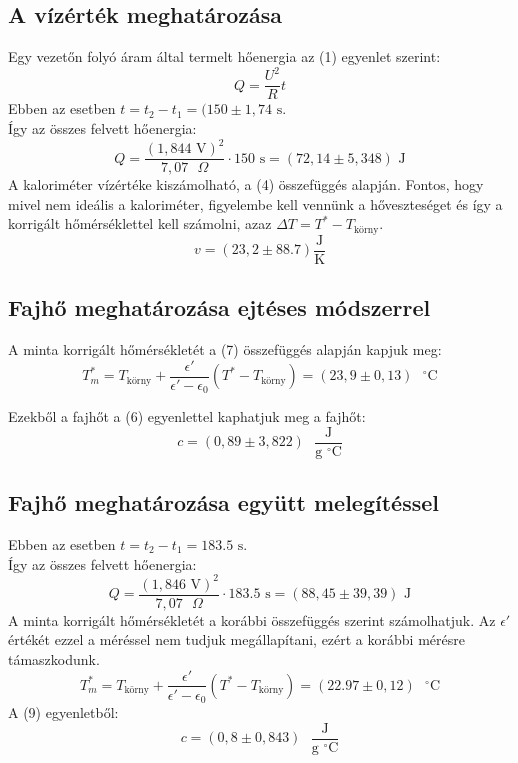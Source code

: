 \documentclass[a4paper, 12pt, oneside]{article}
\begin{document}
\subsection*{A vízérték meghatározása}
    Egy vezetőn folyó áram által termelt hőenergia az (1) egyenlet szerint:
    $$ Q = \frac{U^2}{R}t$$
    Ebben az esetben $t = t_2 - t_1 = (150 \pm 1,74 \textrm{ s}$. \\ Így az összes felvett hőenergia: $$Q = \frac{(1,844 \textrm{ V})^2}{7,07 \textrm{ }\Omega } \cdot 150 \textrm{ s} = (72,14 \pm 5,348) \textrm{ J}$$
    A kaloriméter vízértéke kiszámolható, a (4) összefüggés alapján. Fontos, hogy mivel nem ideális a kaloriméter, figyelembe kell vennünk a hőveszteséget és így a korrigált hőmérséklettel kell számolni, azaz $\Delta T = T^*-T_\textrm{körny}$. $$ v =  (23,2 \pm 88.7) \frac{\textrm{J}}{\textrm{K}}$$

\subsection*{Fajhő meghatározása ejtéses módszerrel}
    A minta korrigált hőmérsékletét a (7) összefüggés alapján kapjuk meg:  
        $$T_m^*=T_{\textrm{körny}}+\frac{\epsilon'}{\epsilon'-\epsilon_0}(T^*-T_\textrm{körny}) = (23,9 \pm 0,13) \textrm{ } ^\circ \textrm{C}$$

Ezekből a fajhőt a (6) egyenlettel kaphatjuk meg a fajhőt:
\begin{equation*}
    c =  (0,89 \pm 3,822) \textrm{ }\frac{\textrm{J}}{\textrm{g $^\circ$C}}
\end{equation*}

\subsection*{Fajhő meghatározása együtt melegítéssel}
    Ebben az esetben $t = t_2 - t_1 = 183.5 \textrm{ s}$. \\ Így az összes felvett hőenergia: $$Q = \frac{(1,846 \textrm{ V})^2}{7,07 \textrm{ }\Omega } \cdot 183.5 \textrm{ s} = (88,45 \pm 39,39)\textrm{ J}$$
    A minta korrigált hőmérsékletét a korábbi összefüggés szerint számolhatjuk. Az $\epsilon '$ értékét ezzel a méréssel nem tudjuk megállapítani, ezért a korábbi mérésre támaszkodunk. 
    $$T_m^*=T_{\textrm{körny}}+\frac{\epsilon'}{\epsilon'-\epsilon_0}(T^*-T_\textrm{körny}) = (22.97 \pm 0,12) \textrm{ }^\circ \textrm{C}$$
    A (9) egyenletből:
$$
    c= (0,8 \pm 0,843) \textrm{ }\frac{\textrm{J}}{\textrm{g $^\circ$C}}
$$
\end{document}
